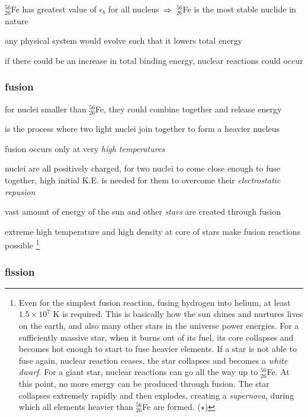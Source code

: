 \cmt $^{56}_{26}$Fe has greatest value of $\epsilon_b$ for all nucleus $\, \Rightarrow \,$ $^{56}_{26}$Fe is the most stable nuclide in nature

\cmt any physical system would evolve such that it lowers total energy

if there could be an increase in total binding energy, nuclear reactions could occur


\subsubsection{fusion}

for nuclei smaller than $^{56}_{26}$Fe, they could combine together and release energy

\begin{ilight}
	 is the process where two light nuclei join together to form a heavier nucleus
\end{ilight}

\cmt fusion occurs only at very \emph{high temperatures}

nuclei are all positively charged, for two nuclei to come close enough to fuse together, high initial K.E. is needed for them to overcome their \emph{electrostatic repusion}

\cmt vast amount of energy of the sun and other \emph{stars} are created through fusion

extreme high temperature and high density at core of stars make fusion reactions possible
\footnote{Even for the simplest fusion reaction, fusing hydrogen into helium, at least $1.5\times 10^7 \text{ K}$ is required. This is basically how the sun shines and nurtures lives on the earth, and also many other stars in the universe power energies. For a sufficiently massive star, when it burns out of its fuel, its core collapses and becomes hot enough to start to fuse heavier elements. If a star is not able to fuse again, nuclear reaction ceases, the star collapses and becomes a \emph{white dwarf}. For a giant star, nuclear reactions can go all the way up to $^{56}_{26}$Fe. At this point, no more energy can be produced through fusion. The star collapses extremely rapidly and then explodes, creating a \emph{supernova}, during which all elements heavier than $^{56}_{26}$Fe are formed. ($\star$)}


\subsubsection{fission}

